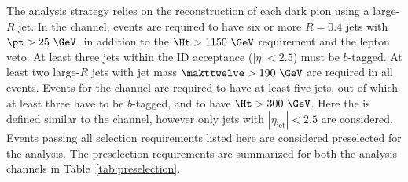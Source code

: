 The analysis strategy relies on the reconstruction of each dark pion
using a large-$R$ jet.
In the \allhad channel, events are required to have six or more $R=0.4$ jets with $\pt>25~\GeV$, in addition to the $\Ht > 1150~\GeV$ requirement and the lepton veto. At least three jets within the ID acceptance ($|\eta| < 2.5$) must be $b$-tagged. At least two large-$R$ jets with jet mass $\makttwelve>190~\GeV$ are required in all events. Events for the \onelep channel are required to have at least five jets, out of which at least three have to be $b$-tagged, and to have $\Ht>300~\GeV$. Here the \Ht is defined similar to the \allhad channel, however only jets with $|\eta_{\text{jet}}|<2.5$ are considered. Events passing all selection requirements listed here are considered preselected for the analysis. The preselection requirements are summarized for both the analysis channels in Table~\ref{tab:preselection}.

\begin{table}[]
\centering
\caption{Summary of the preselection criteria for the \allhad and \onelep channels, in terms of the number of baseline and signal leptons, $R=0.4$ and $R=1.2$ jets, number of \bjets, and \Ht. The definitions of the physics objects for the two channels are given in the text. Signal leptons constitute a subset of the baseline leptons.
}
\label{tab:preselection}
\end{table}
